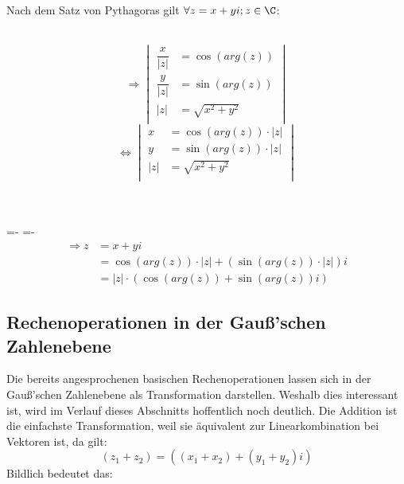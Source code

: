 \documentclass[main.tex]{subfiles}
\begin{document}
		\begin{Beweis}
			Nach dem Satz von Pythagoras gilt $\forall z = x + yi ; z \in \C$:
			\\\\
			\begin{minipage}{0.29\textwidth}
				\text{ }
			\end{minipage}
			\begin{minipage}{0.71\textwidth}
				$$\Rightarrow	 \begin{vmatrix}
					\dfrac{x}{|z|} &= \cos(arg(z)) 	   \\
					\dfrac{y}{|z|} &= \sin(arg(z)) 	   \\
								|z| &= \sqrt{x^2 + y^2} \\
				\end{vmatrix}$$
				$$\Leftrightarrow \begin{vmatrix}
						x &= \cos(arg(z)) \cdot |z| \\
						y &= \sin(arg(z)) \cdot |z| \\
					|z| &= \sqrt{x^2 + y^2} 	  \\
				\end{vmatrix}$$
			\end{minipage}
			\\\\
			\abovedisplayskip=-\baselineskip
			\belowdisplayskip=0pt
			\abovedisplayshortskip=-\baselineskip
			\belowdisplayshortskip=0pt
			\begin{align*}
				\Rightarrow z &= x + yi \\
							  &= \cos(arg(z)) \cdot |z| + (\sin(arg(z)) \cdot |z|)i \\
							  &= |z| \cdot (\cos(arg(z)) + \sin(arg(z))i)
			\end{align*}

		\end{Beweis}

	\subsection{Rechenoperationen in der Gauß'schen Zahlenebene}

		Die bereits angesprochenen basischen Rechenoperationen lassen sich in der Gauß'schen Zahlenebene als Transformation darstellen. Weshalb dies interessant ist, wird im Verlauf dieses Abschnitts hoffentlich noch deutlich.
		Die Addition ist die einfachste Transformation, weil sie äquivalent zur Linearkombination bei Vektoren ist, da gilt: $$(z_1 + z_2) = ((x_1 + x_2) + (y_1 + y_2)i)$$ Bildlich bedeutet das:
\end{document}
